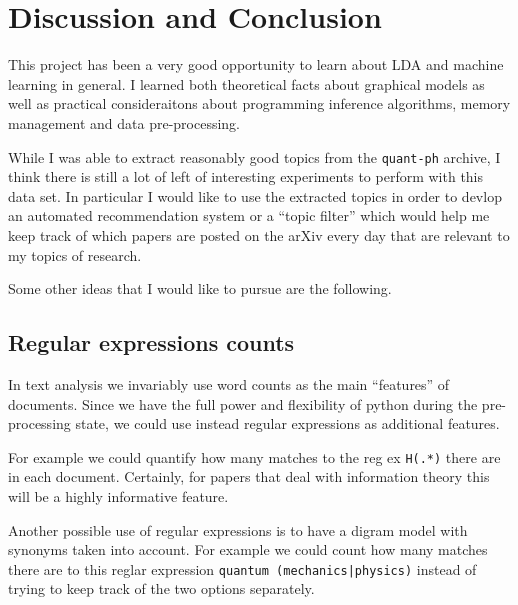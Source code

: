 \documentclass[11pt]{article}
\begin{document}
\section{Discussion and Conclusion}

    This project has been a very good opportunity to learn about LDA and machine learning in
    general.
    I learned both theoretical facts about graphical models as well as practical consideraitons
    about programming inference algorithms, memory management and data pre-processing.

    While I was able to extract reasonably good topics from the \texttt{quant-ph} archive,
    I think there is still a lot of left of interesting experiments to perform with this data set.
    In particular I would like to use the extracted topics in order to devlop an automated
    recommendation system or a ``topic filter'' which would help me keep track of which papers
    are posted on the arXiv every day that are relevant to my topics of research.

    Some other ideas that I would like to pursue are the following.

	\subsection{Regular expressions counts}
        
        In text analysis we invariably use word counts as the main ``features'' of documents.
        Since we have the full power and flexibility of python during the pre-processing state,
        we could use instead regular expressions as additional features.

        For example we could quantify how many matches to the reg ex \texttt{H(.*)} there are
        in each document. Certainly, for papers that deal with information theory this will be 
        a highly informative feature.

        Another possible use of regular expressions is to have a digram model with synonyms
        taken into account. For example we could count how many matches there are to this
        reglar expression \texttt{quantum (mechanics|physics)} instead of trying to keep
        track of the two options separately.
		
\end{document}
